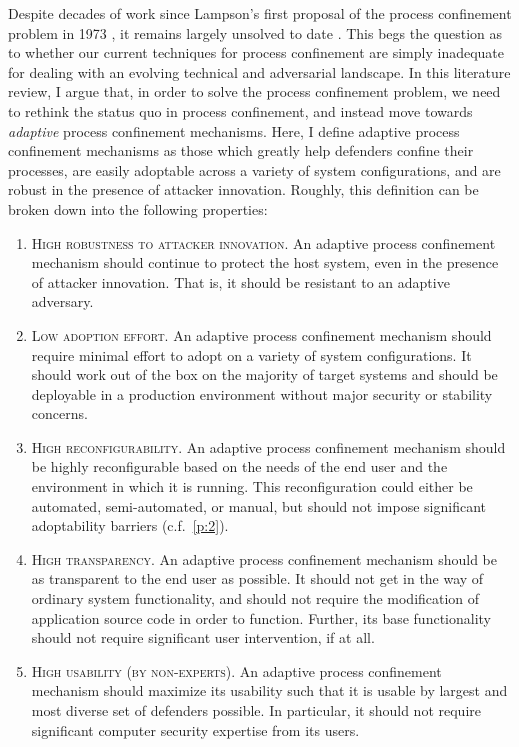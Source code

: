 \documentclass[dvipsnames, 12pt]{article}
\begin{document}
Despite decades of work since Lampson's first proposal of the process
confinement problem in 1973 \cite{lampson1973_a_note}, it remains largely
unsolved to date \cite{crowell2013_confinement_problem}. This begs the question
as to whether our current techniques for process confinement are simply
inadequate for dealing with an evolving technical and adversarial landscape.  In
this literature review, I argue that, in order to solve the process confinement
problem, we need to rethink the status quo in process confinement, and instead
move towards \textit{adaptive} process confinement mechanisms.  Here, I define
adaptive process confinement mechanisms as those which greatly help defenders
confine their processes, are easily adoptable across a variety of system
configurations, and are robust in the presence of attacker innovation.  Roughly,
this definition can be broken down into the following properties:
\begin{enumerate}[label=\bfseries P\arabic*., ref=P\arabic*, labelindent=2em]
    \item \label{p:1} \textsc{High robustness to attacker innovation.} An adaptive
    process confinement mechanism should continue to protect the host system,
    even in the presence of attacker innovation. That is, it should be resistant
    to an adaptive adversary.

    \item \label{p:2} \textsc{Low adoption effort.} An adaptive process
    confinement mechanism should require minimal effort to adopt on a variety of
    system configurations. It should work out of the box on the majority of
    target systems and should be deployable in a production environment without
    major security or stability concerns.

    \item \label{p:3} \textsc{High reconfigurability.} An adaptive process
    confinement mechanism should be highly reconfigurable based on the needs of
    the end user and the environment in which it is running. This
    reconfiguration could either be automated, semi-automated, or manual, but
    should not impose significant adoptability barriers (c.f.~\ref{p:2}).

    \item \label{p:4} \textsc{High transparency.} An adaptive process
    confinement mechanism should be as transparent to the end user as possible.
    It should not get in the way of ordinary system functionality, and should
    not require the modification of application source code in order to
    function. Further, its base functionality should not require significant
    user intervention, if at all.

    \item \label{p:5} \textsc{High usability (by non-experts).} An adaptive process confinement
    mechanism should maximize its usability such that it is usable by largest
    and most diverse set of defenders possible. In particular, it should not
    require significant computer security expertise from its users.
\end{enumerate}
\end{document}
